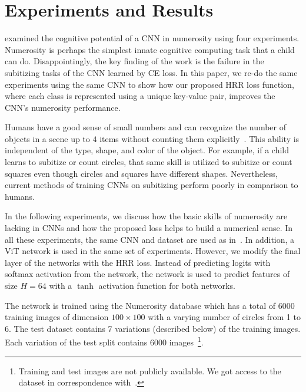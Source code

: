 \documentclass[letterpaper]{article} %
\DeclarePairedDelimiter{\norm}{\lVert}{\rVert}
\begin{document}


\section{Experiments and Results} \label{sec:experiments}
\citet{b1} examined the cognitive potential of a CNN in numerosity using four experiments. Numerosity is perhaps the simplest innate cognitive computing task that a child can do.  Disappointingly, the key finding of the work is the failure in the subitizing tasks of the CNN learned by CE loss. In this paper, we re-do the same experiments using the same CNN to show how our proposed HRR loss function, where each class is represented using a unique key-value pair, improves the CNN’s numerosity performance.
\par
Humans have a good sense of small numbers and can recognize the number of objects in a scene up to $4$ items without counting them explicitly~\cite{b4, b5, b6}. This ability is independent of the type, shape, and color of the object.  For example, if a child learns to subitize or count circles, that same skill is utilized to subitize or count squares even though circles and squares have different shapes. Nevertheless, current methods of training CNNs on subitizing perform poorly in comparison to humans.
\par
In the following experiments, we discuss how the basic skills of numerosity are lacking in CNNs and how the proposed loss helps to build a numerical sense. In all these experiments, the same CNN and dataset are used as in~\cite{b1}.  In addition, a ViT network is used in the same set of experiments. However, we modify the final layer of the networks with the HRR loss. Instead of predicting logits with softmax activation from the network, the network is used to predict features of size $H=64$ with a $\tanh$ activation function for both networks.
\par
The network is trained using the Numerosity database which has a total of $6000$ training images of dimension $100 \times 100$ with a varying number of circles from 1 to 6. The test dataset contains 7 variations (described below) of the training images. Each variation of the test split contains $6000$ images~\footnote{Training and test images are not publicly available. We got access to the dataset in correspondence with~\cite{b1}.}.
\end{document}
